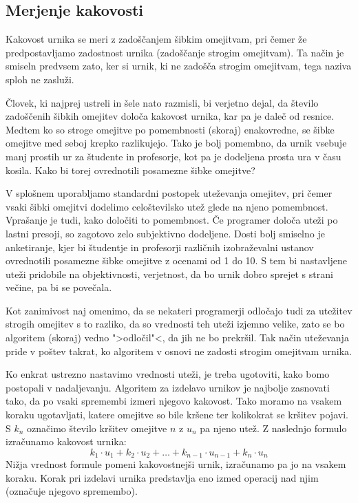 \documentclass[a4paper,10pt]{article}
\begin{document}
\subsection{Merjenje kakovosti} %

Kakovost urnika se meri z zadoščanjem šibkim omejitvam, pri čemer že predpostavljamo
zadostnost urnika (zadoščanje strogim omejitvam). Ta način je smiseln predvsem zato,
ker si urnik, ki ne zadošča strogim omejitvam, tega naziva sploh ne zasluži.

Človek, ki najprej ustreli in šele nato razmisli, bi verjetno dejal, da število
zadoščenih šibkih omejitev določa kakovost urnika, kar pa je daleč od resnice. Medtem
ko so stroge omejitve po pomembnosti (skoraj) enakovredne, se šibke omejitve med seboj
krepko razlikujejo. Tako je bolj pomembno, da urnik vsebuje manj prostih ur za
študente in profesorje, kot pa je dodeljena prosta ura v času kosila. Kako bi torej
ovrednotili posamezne šibke omejitve?

V splošnem uporabljamo standardni postopek uteževanja omejitev, pri čemer vsaki šibki
omejitvi dodelimo celoštevilsko utež glede na njeno pomembnost. Vprašanje je tudi, kako
določiti to pomembnost. Če programer določa uteži po lastni presoji, so zagotovo zelo
subjektivno dodeljene. Dosti bolj smiselno je anketiranje, kjer bi študentje in profesorji
različnih izobraževalni ustanov ovrednotili posamezne šibke omejitve z ocenami od 1 do 10.
S tem bi nastavljene uteži pridobile na objektivnosti, verjetnost, da bo urnik dobro
sprejet s strani večine, pa bi se povečala.

Kot zanimivost naj omenimo, da se nekateri programerji odločajo tudi za utežitev strogih
omejitev s to razliko, da so vrednosti teh uteži izjemno velike, zato se bo algoritem
(skoraj) vedno ">odločil"<, da jih ne bo prekršil. Tak način uteževanja pride v poštev
takrat, ko algoritem v osnovi ne zadosti strogim omejitvam urnika.

Ko enkrat ustrezno nastavimo vrednosti uteži, je treba ugotoviti, kako bomo postopali
v nadaljevanju. Algoritem za izdelavo urnikov je najbolje zasnovati tako, da po vsaki
spremembi izmeri njegovo kakovost. Tako moramo na vsakem koraku ugotavljati, katere
omejitve so bile kršene ter kolikokrat se kršitev pojavi. S \(k_n\) označimo število
kršitev omejitve \(n\) z \(u_n\) pa njeno utež. Z naslednjo formulo izračunamo
kakovost urnika:
\[k_1 \cdot u_1 + k_2 \cdot u_2 + \dots + k_{n-1} \cdot u_{n-1} + k_n \cdot u_n\]
Nižja vrednost formule pomeni kakovostnejši urnik, izračunamo pa jo na vsakem koraku.
Korak pri izdelavi urnika predstavlja eno izmed operacij nad njim (označuje njegovo
spremembo).
\end{document}
